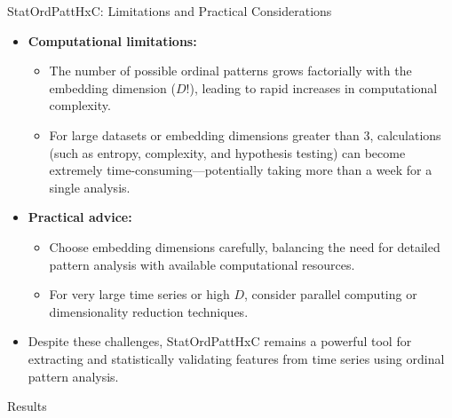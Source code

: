 \documentclass{beamer}
\begin{document}
\begin{frame}{StatOrdPattHxC: Limitations and Practical Considerations}
	\begin{itemize}
		\item \textbf{Computational limitations:}
		\begin{itemize}
			\item The number of possible ordinal patterns grows factorially with the embedding dimension ($D!$), leading to rapid increases in computational complexity.
			\item For large datasets or embedding dimensions greater than 3, calculations (such as entropy, complexity, and hypothesis testing) can become extremely time-consuming—potentially taking more than a week for a single analysis.
		\end{itemize}
		\item \textbf{Practical advice:}
		\begin{itemize}
			\item Choose embedding dimensions carefully, balancing the need for detailed pattern analysis with available computational resources.
			\item For very large time series or high $D$, consider parallel computing or dimensionality reduction techniques.
		\end{itemize}
		\item Despite these challenges, StatOrdPattHxC remains a powerful tool for extracting and statistically validating features from time series using ordinal pattern analysis.
	\end{itemize}
\end{frame}

\begin{frame}
	\begin{center}
		\alert{Results}
	\end{center}
\end{frame}

\end{document}
